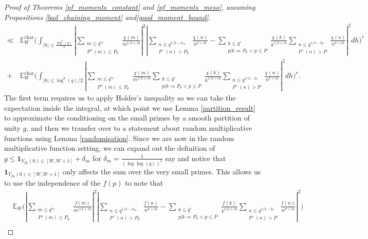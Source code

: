 \documentclass[10pt,a4paper]{amsart}
\numberwithin{equation}{section}
\begin{document}
\begin{proof}[Proof of Theorems \ref{pf_moments_constant} and \ref{pf_moments_meso}, assuming Propositions \ref{bad_chaining_moment} and\ref{good_moment_bound}]
\begin{align*}
        \ll& \mathbb{E}_W^{\text{char}}\big(\int_{|h| \leq \frac{\log^\theta(q)}{2}}|\sum_{\substack{m \leq q^{\varepsilon_\theta} \\ P^+(m) \leq P_\theta}}\frac{\chi(m)}{m^{1/2+ih}}|^2|\sum_{\substack{n \leq q^{1/2-2\varepsilon_\theta} \\ P^{-}(n) >P_\theta}}\frac{\chi(n)}{n^{\sigma+ih}}-\sum_{\substack{k \leq q^{\varepsilon} \\ p|k \Rightarrow P_\theta < p \leq P}}\frac{\chi(k)}{k^{1/2+ih}}\sum_{\substack{n \leq q^{1/2-2\varepsilon} \\ P^{-}(n) > P}}\frac{\chi(n)}{n^{\sigma+ih}}|^2dh\big)^r \\
        +& \mathbb{E}_W^{\text{char}}\big(\int_{|h| \leq \log^\theta(q)/2}|\sum_{\substack{m \leq q^{\varepsilon_\theta} \\ P^+(m) \leq P_\theta}}\frac{\chi(m)}{m^{1/2+ih}}\sum_{\substack{k \leq q^{\varepsilon} \\ p|k \Rightarrow P_\theta < p \leq P}}\frac{\chi(k)}{k^{1/2+ih}}\sum_{\substack{n \leq q^{1/2-2\varepsilon} \\ P^{-}(n) > P}}\frac{\chi(n)}{n^{\sigma+ih}}|^2dh\big)^r.
    \end{align*}
    The first term requires us to apply Holder's inequality so we can take the expectation inside the integral, at which point we use Lemma \ref{partition_result} to approximate the conditioning on the small primes by a smooth partition of unity $g$, and then we transfer over to a statement about random multiplicative functions using Lemma \ref{randomisation}. Since we are now in the random multiplicative function setting, we can expand out the definition of $g \leq \mathbf{1}_{Y_{P_\theta}(0) \in [W,W+1]}+\delta_m$ for $\delta_m = \frac{1}{(\log\log(q))^2}$ say and notice that $\mathbf{1}_{Y_{P_\theta}(0) \in [W,W+1]}$ only affects the sum over the very small primes. This allows us to use the independence of the $f(p)$ to note that
    \begin{equation*}\begin{split}
        &\mathbb{E}_W\big(|\sum_{\substack{m \leq q^{\varepsilon_\theta} \\ P^+(m) \leq P_\theta}}\frac{f(m)}{m^{1/2+ih}}|^2|\sum_{\substack{n \leq q^{1/2-2\varepsilon_\theta} \\ P^{-}(n) >P_\theta}}\frac{f(n)}{n^{\sigma+ih}}-\sum_{\substack{k \leq q^{\varepsilon} \\ p|k \Rightarrow P_\theta < p \leq P}}\frac{f(k)}{k^{1/2+ih}}\sum_{\substack{n \leq q^{1/2-2\varepsilon} \\ P^{-}(n) > P}}\frac{f(n)}{n^{\sigma+ih}}|^2\big) \\

\end{split}
\end{equation*}
\end{proof}
\end{document}
